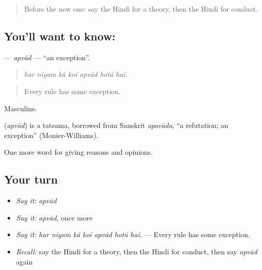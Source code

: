 \label{lesson:HI-C365-apvad}



\begin{quote}
Before the new one: say the Hindi for a theory, then the Hindi for conduct.
\end{quote}

\subsection*{You'll want to know: }
\textbf{} — \emph{apvād} — \textquotedblleft{}an exception\textquotedblright{}.

\begin{quote}
      
\end{quote}

\begin{quote}
\emph{har niyam kā koī apvād hotā hai.}
\end{quote}

\begin{quote}
Every rule has some exception.
\end{quote}

Masculine.

\begin{cousinweb}
\textbf{} (\emph{apvād}) is a tatsama, borrowed from Sanskrit \emph{apavāda}, \textquotedblleft{}a refutation; an exception\textquotedblright{} (Monier-Williams).
\end{cousinweb}

\begin{grammarlens}[title={What you've built}]
One more word for giving reasons and opinions.
\end{grammarlens}

\subsection*{Your turn}
\begin{itemize}
\raggedright
  \item \emph{Say it:} \emph{apvād}
  \item \emph{Say it:} \emph{apvād}, once more
  \item \emph{Say it:} \emph{har niyam kā koī apvād hotā hai.} — Every rule has some exception.
  \item \emph{Recall:} say the Hindi for a theory, then the Hindi for conduct, then say \emph{apvād} again
\end{itemize}

